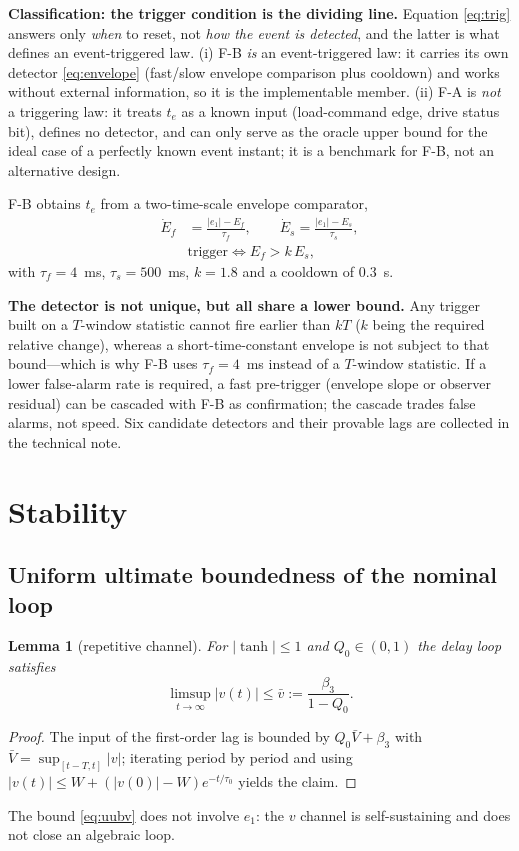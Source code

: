 \documentclass[journal]{IEEEtran}
\newtheorem{lemma}{Lemma}
\theoremstyle{remark}
\newcommand{\st}{\operatorname{tanh}}
\begin{document}
\textbf{Classification: the trigger condition is the dividing line.} Equation
\eqref{eq:trig} answers only \emph{when} to reset, not \emph{how the event is detected},
and the latter is what defines an event-triggered law. (i) F-B \emph{is} an
event-triggered law: it carries its own detector \eqref{eq:envelope} (fast/slow envelope
comparison plus cooldown) and works without external information, so it is the
implementable member. (ii) F-A is \emph{not} a triggering law: it treats $t_e$ as a
known input (load-command edge, drive status bit), defines no detector, and can only
serve as the oracle upper bound for the ideal case of a perfectly known event instant;
it is a benchmark for F-B, not an alternative design.

F-B obtains $t_e$ from a two-time-scale envelope comparator,
\begin{equation}
\begin{aligned}
\dot E_f&=\frac{|e_1|-E_f}{\tau_f},\qquad \dot E_s=\frac{|e_1|-E_s}{\tau_s},\\
&\text{trigger}\iff E_f>k\,E_s ,
\end{aligned}
\label{eq:envelope}
\end{equation}
with $\tau_f=4$~ms, $\tau_s=500$~ms, $k=1.8$ and a cooldown of $0.3$~s.

\textbf{The detector is not unique, but all share a lower bound.} Any trigger built on a
$T$-window statistic cannot fire earlier than $kT$ ($k$ being the required relative
change), whereas a short-time-constant envelope is not subject to that bound—which is
why F-B uses $\tau_f=4$~ms instead of a $T$-window statistic. If a lower false-alarm
rate is required, a fast pre-trigger (envelope slope or observer residual) can be
cascaded with F-B as confirmation; the cascade trades false alarms, not speed. Six
candidate detectors and their provable lags are collected in the technical note.

\section{Stability}\label{sec:stab}
\subsection{Uniform ultimate boundedness of the nominal loop}
\begin{lemma}[repetitive channel]\label{lem:v}
For $|\st|\le1$ and $Q_0\in(0,1)$ the delay loop satisfies
\begin{equation}
\limsup_{t\to\infty}|v(t)|\le\bar v:=\frac{\beta_3}{1-Q_0}.
\label{eq:uubv}
\end{equation}
\end{lemma}
\begin{proof}
The input of the first-order lag is bounded by $Q_0\bar V+\beta_3$ with
$\bar V=\sup_{[t-T,t]}|v|$; iterating period by period and using
$|v(t)|\le W+(|v(0)|-W)e^{-t/\tau_0}$ yields the claim.
\end{proof}
The bound \eqref{eq:uubv} does not involve $e_1$: the $v$ channel is self-sustaining
and does not close an algebraic loop.
\end{document}
